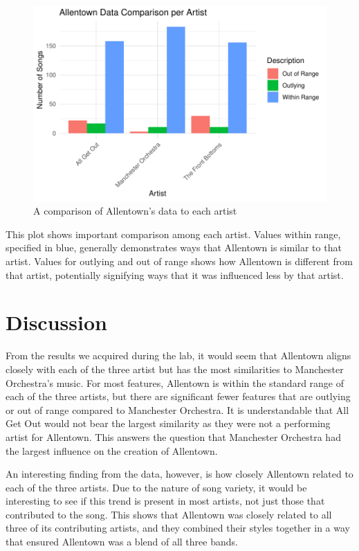 \documentclass{article}\usepackage[]{graphicx}\usepackage[]{xcolor}
\begin{document}
\begin{multicols}{2}
\begin{figure}[H]
 \begin{center}
 \includegraphics[scale=0.65]{descript_plot.pdf}
 \caption{A comparison of Allentown's data to each artist}
 \label{plot3}
 \end{center}
 \end{figure}

This plot shows important comparison among each artist. Values within range, specified in blue, generally demonstrates ways that Allentown is similar to that artist. Values for outlying and out of range shows how Allentown is different from that artist, potentially signifying ways that it was influenced less by that artist.

\section{Discussion}
From the results we acquired during the lab, it would seem that Allentown aligns closely with each of the three artist but has the most similarities to Manchester Orchestra's music. For most features, Allentown is within the standard range of each of the three artists, but there are significant fewer features that are outlying or out of range compared to Manchester Orchestra. It is understandable that All Get Out would not bear the largest similarity as they were not a performing artist for Allentown. This answers the question that Manchester Orchestra had the largest influence on the creation of Allentown. 

An interesting finding from the data, however, is how closely Allentown related to each of the three artists. Due to the nature of song variety, it would be interesting to see if this trend is present in most artists, not just those that contributed to the song. This shows that Allentown was closely related to all three of its contributing artists, and they combined their styles together in a way that ensured Allentown was a blend of all three bands. 


\end{multicols}
\end{document}
